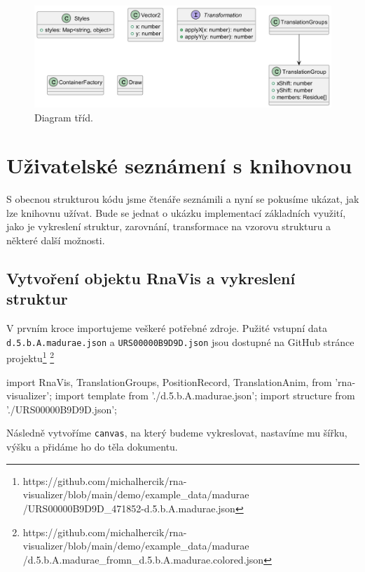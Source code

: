 \begin{figure}[H]
  \centering
  \includegraphics[width=145mm]{../img/kap03/others.png}
  \caption{Diagram tříd.}
\end{figure}

\section{Uživatelské seznámení s knihovnou}

S obecnou strukturou kódu jsme čtenáře seznámili a nyní se pokusíme ukázat, jak
lze knihovnu užívat. Bude se jednat o ukázku implementací základních využití,
jako je vykreslení struktur, zarovnání, transformace na vzorovu strukturu a
některé další možnosti.

\subsection{Vytvoření objektu RnaVis a vykreslení struktur}

V prvním kroce importujeme veškeré potřebné zdroje. Pužité vstupní data
\texttt{d.5.b.A.madurae.json} a \texttt{URS00000B9D9D.json} jsou dostupné na
GitHub stránce
projektu\footnote{https://github.com/michalhercik/rna-visualizer/blob/main/demo/example\_data/madurae\\/URS00000B9D9D\_471852-d.5.b.A.madurae.json}
\footnote{https://github.com/michalhercik/rna-visualizer/blob/main/demo/example\_data/madurae\\/d.5.b.A.madurae\_fromn\_d.5.b.A.madurae.colored.json}

\begin{code}
import { 
  RnaVis, 
  TranslationGroups, 
  PositionRecord,
  TranslationAnim,
} from 'rna-visualizer';
import template from './d.5.b.A.madurae.json';
import structure from './URS00000B9D9D.json';
\end{code}

Následně vytvoříme \texttt{canvas}, na který budeme vykreslovat, nastavíme mu
šířku, výšku a přidáme ho do těla dokumentu.

